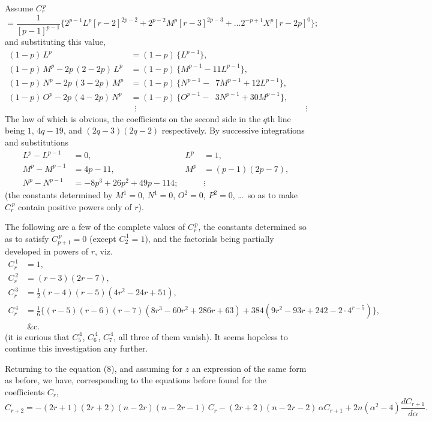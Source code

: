 \documentclass[11pt,a4paper]{book}
\begin{document}
Assume $C_r^{\,p}$
\[
= \frac{1}{[p-1]^{p-1}} \{2^{p-1} L^p [r-2]^{2p-2} + 2^{p-2} M^p [r-3]^{2p-3} + \ldots 2^{-p+1} X^p [r-2p]^0\};
\]
and substituting this value,
\begin{align*}
(1-p)\,L^p &= (1-p)\,\{L^{p-1}\}, \\
(1-p)\,M^p - 2p\,(2-2p)\,L^p &= (1-p)\,\{M^{p-1} - 11L^{p-1}\}, \\
(1-p)\,N^p - 2p\,(3-2p)\,M^p &= (1-p)\,\{N^{p-1} - \phantom{1}7M^{p-1} + 12L^{p-1}\}, \\
(1-p)\,O^p - 2p\,(4-2p)\,N^p &= (1-p)\,\{O^{p-1} - \phantom{1}3N^{p-1} + 30M^{p-1}\}, \\
&\ \;\vdots & &\ \;\vdots
\end{align*}
The law of which is obvious, the coefficients on the second side in the $q$th line being $1$, $4q-19$, and $(2q-3)(2q-2)$ respectively. By successive integrations and substitutions
\begin{align*}
L^p - L^{p-1} &= 0, & L^p &= 1, \\
M^p - M^{p-1} &= 4p - 11, & M^p &= (p-1)(2p-7), \\
N^p - N^{p-1} &= -8p^3 + 26p^2 + 49p - 114; & &\vdots
\end{align*}
(the constants determined by $M^1 = 0$, $N^1 = 0$, $O^2 = 0$, $P^2 = 0$, \ldots\ so as to make $C_r^{\,p}$ contain positive powers only of $r$).

The following are a few of the complete values of $C_r^{\,p}$, the constants determined so as to satisfy $C_{p+1}^{\,p} = 0$ (except $C_2^{\,1} = 1$), and the factorials being partially developed in powers of $r$, viz.
\begin{align*}
C_r^{\,1} &= 1, \\
C_r^{\,2} &= (r-3)(2r-7), \\
C_r^{\,3} &= \tfrac{1}{2}(r-4)(r-5)(4r^2 - 24r + 51), \\
C_r^{\,4} &= \tfrac{1}{6}\{(r-5)(r-6)(r-7)(8r^3 - 60r^2 + 286r + 63) + 384(9r^2 - 93r + 242 - 2 \cdot 4^{r-5})\}, \\
&\ \&\text{c.}
\end{align*}
(it is curious that $C_5^{\,4}$, $C_6^{\,4}$, $C_7^{\,4}$, all three of them vanish). It seems hopeless to continue this investigation any further.

Returning to the equation (8), and assuming for $z$ an expression of the same form as before, we have, corresponding to the equations before found for the coefficients $C_r$,
\[
C_{r+2} = -(2r+1)(2r+2)(n-2r)(n-2r-1)\,C_r - (2r+2)(n-2r-2)\,\alpha C_{r+1} + 2n(\alpha^2 - 4)\frac{dC_{r+1}}{d\alpha}.
\]
\end{document}
